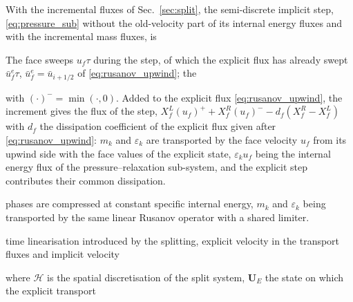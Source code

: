 {%
With the incremental fluxes of Sec.~\ref{sec:split}, the semi-discrete implicit step, \eqref{eq:pressure_sub} without the old-velocity part of
its internal energy fluxes and with the incremental mass fluxes, is

The face sweeps $u_f\tau$ during the step, of which the explicit flux has already swept $\bar u^e_f\tau$, $\bar u^e_f=\bar u_{i+1/2}$ of \eqref{eq:rusanov_upwind}; the

with $(\cdot)^-=\min(\cdot,0)$. Added to the explicit flux \eqref{eq:rusanov_upwind}, the increment gives the flux of the step,
$X^L_f(u_f)^++X^R_f(u_f)^--d_f(X^R_f-X^L_f)$ with $d_f$ the dissipation coefficient of the explicit flux given after \eqref{eq:rusanov_upwind}: $m_k$ and $\varepsilon_k$ are transported by the
face velocity $u_f$ from its upwind side with the face values of the explicit state, $\varepsilon_ku_f$ being the internal energy flux of the
pressure--relaxation sub-system, and the explicit step contributes their common dissipation.

phases are compressed at constant specific internal energy, $m_k$ and $\varepsilon_k$ being transported by the same linear Rusanov operator with a shared limiter.

time linearisation introduced by the splitting, explicit velocity in the transport fluxes and implicit velocity

where $\mathcal H$ is the spatial discretisation of the split system, $\mathbf U_E$ the state on which the explicit transport

}
